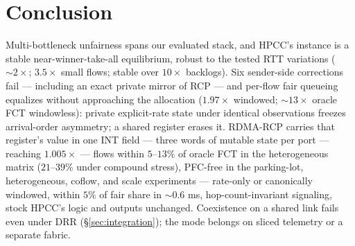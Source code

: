 \documentclass[sigconf, nonacm]{acmart}
\newcommand{\hpccfs}{\textsc{RDMA-RCP}\xspace}
\begin{document}
\section{Conclusion}

Multi-bottleneck unfairness spans our evaluated stack, and HPCC's
instance is a stable near-winner-take-all equilibrium, robust to the tested RTT variations
(${\sim}2\times$;
$3.5\times$ small flows; stable over $10\times$ backlogs). Six sender-side
corrections fail --- including an exact private mirror of RCP --- and per-flow fair queueing
equalizes without approaching the allocation ($1.97\times$ windowed; ${\sim}13\times$
oracle FCT windowless): private explicit-rate state under identical observations freezes
arrival-order asymmetry; a shared register erases it. \hpccfs carries that
register's value in one INT field --- three words of mutable state per port --- reaching
$1.005\times$ --- flows within $5$--$13\%$ of oracle FCT in the heterogeneous matrix
($21$--$39\%$ under compound stress), PFC-free in the parking-lot, heterogeneous, coflow, and
scale experiments --- rate-only or canonically windowed, within $5\%$ of fair share in ${\sim}0.6$ ms,
hop-count-invariant signaling, stock HPCC's logic and outputs unchanged.
Coexistence on a shared link fails even under DRR (\S\ref{sec:integration}); the mode
belongs on sliced telemetry or a separate fabric.



\end{document}
